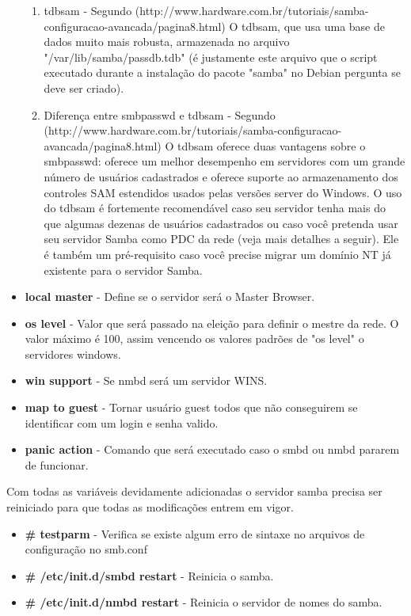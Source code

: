 \begin{itemize}
\begin{enumerate}
			\item{tdbsam} - Segundo (http://www.hardware.com.br/tutoriais/samba-configuracao-avancada/pagina8.html) O tdbsam, que usa uma base de dados muito mais robusta, armazenada no arquivo "/var/lib/samba/passdb.tdb" (é justamente este arquivo que o script executado durante a instalação do pacote "samba" no Debian pergunta se deve ser criado).
			\item{Diferença entre smbpasswd e tdbsam} - Segundo (http://www.hardware.com.br/tutoriais/samba-configuracao-avancada/pagina8.html) O tdbsam oferece duas vantagens sobre o smbpasswd: oferece um melhor desempenho em servidores com um grande número de usuários cadastrados e oferece suporte ao armazenamento dos controles SAM estendidos usados pelas versões server do Windows. O uso do tdbsam é fortemente recomendável caso seu servidor tenha mais do que algumas dezenas de usuários cadastrados ou caso você pretenda usar seu servidor Samba como PDC da rede (veja mais detalhes a seguir). Ele é também um pré-requisito caso você precise migrar um domínio NT já existente para o servidor Samba. 
		\end{enumerate}
	\item \textbf{local master} - Define se o servidor será o Master Browser.
	\item \textbf{os level} - Valor que será passado na eleição para definir o mestre da rede. O valor máximo é 100, assim vencendo os valores padrões de "os level" o servidores windows.
	\item \textbf{win support} - Se nmbd será um servidor WINS.
	\item \textbf{map to guest} - Tornar usuário guest todos que não conseguirem se identificar com um login e senha valido.
	\item \textbf{panic action} - Comando que será executado caso o smbd ou nmbd pararem de funcionar.
\end{itemize}

Com todas as variáveis devidamente adicionadas o servidor samba precisa ser reiniciado para que todas as modificações entrem em vigor.

\begin{itemize}
	\item \textbf{\# testparm} - Verifica se existe algum erro de sintaxe no arquivos de configuração no smb.conf
	\item \textbf{\# /etc/init.d/smbd restart} - Reinicia o samba.
	\item \textbf{\# /etc/init.d/nmbd restart} - Reinicia o servidor de nomes do samba.
\end{itemize}

